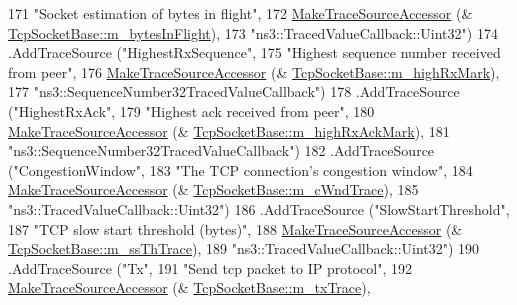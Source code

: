 \begin{DoxyCode}
171                      \textcolor{stringliteral}{"Socket estimation of bytes in flight"},
172                      \hyperlink{group__tracing_gab21a770b9855af4e8f69f7531ea4a6b0}{MakeTraceSourceAccessor} (&
      \hyperlink{classns3_1_1TcpSocketBase_ad7acd30c8700b980142ddd38a52a5401}{TcpSocketBase::m\_bytesInFlight}),
173                      \textcolor{stringliteral}{"ns3::TracedValueCallback::Uint32"})
174     .AddTraceSource (\textcolor{stringliteral}{"HighestRxSequence"},
175                      \textcolor{stringliteral}{"Highest sequence number received from peer"},
176                      \hyperlink{group__tracing_gab21a770b9855af4e8f69f7531ea4a6b0}{MakeTraceSourceAccessor} (&
      \hyperlink{classns3_1_1TcpSocketBase_a9e93feb3fed4ad395da7f3abea173062}{TcpSocketBase::m\_highRxMark}),
177                      \textcolor{stringliteral}{"ns3::SequenceNumber32TracedValueCallback"})
178     .AddTraceSource (\textcolor{stringliteral}{"HighestRxAck"},
179                      \textcolor{stringliteral}{"Highest ack received from peer"},
180                      \hyperlink{group__tracing_gab21a770b9855af4e8f69f7531ea4a6b0}{MakeTraceSourceAccessor} (&
      \hyperlink{classns3_1_1TcpSocketBase_aa53b354456e23b35a97c367e4e03cd97}{TcpSocketBase::m\_highRxAckMark}),
181                      \textcolor{stringliteral}{"ns3::SequenceNumber32TracedValueCallback"})
182     .AddTraceSource (\textcolor{stringliteral}{"CongestionWindow"},
183                      \textcolor{stringliteral}{"The TCP connection's congestion window"},
184                      \hyperlink{group__tracing_gab21a770b9855af4e8f69f7531ea4a6b0}{MakeTraceSourceAccessor} (&
      \hyperlink{classns3_1_1TcpSocketBase_a53183f9cee6315bcb73742b9b9d14970}{TcpSocketBase::m\_cWndTrace}),
185                      \textcolor{stringliteral}{"ns3::TracedValueCallback::Uint32"})
186     .AddTraceSource (\textcolor{stringliteral}{"SlowStartThreshold"},
187                      \textcolor{stringliteral}{"TCP slow start threshold (bytes)"},
188                      \hyperlink{group__tracing_gab21a770b9855af4e8f69f7531ea4a6b0}{MakeTraceSourceAccessor} (&
      \hyperlink{classns3_1_1TcpSocketBase_aba33c4aa346eeb1a205a97844d8ed689}{TcpSocketBase::m\_ssThTrace}),
189                      \textcolor{stringliteral}{"ns3::TracedValueCallback::Uint32"})
190     .AddTraceSource (\textcolor{stringliteral}{"Tx"},
191                      \textcolor{stringliteral}{"Send tcp packet to IP protocol"},
192                      \hyperlink{group__tracing_gab21a770b9855af4e8f69f7531ea4a6b0}{MakeTraceSourceAccessor} (&
      \hyperlink{classns3_1_1TcpSocketBase_a133b5c147fbc16ef12d4788c620cca3c}{TcpSocketBase::m\_txTrace}),

\end{DoxyCode}
